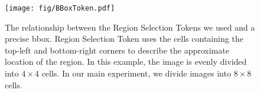 \begin{figure}[t]
  \centering
  \texttt{[image: fig/BBoxToken.pdf]}
   \caption{The relationship between the Region Selection Tokens we used and a precise bbox. Region Selection Token uses the cells containing the top-left and bottom-right corners to describe the approximate location of the region. In this example, the image is evenly divided into $4\times 4$ cells. In our main experiment, we divide images into $8\times 8$ cells.}
   \label{fig:bbox_token}
\end{figure}
